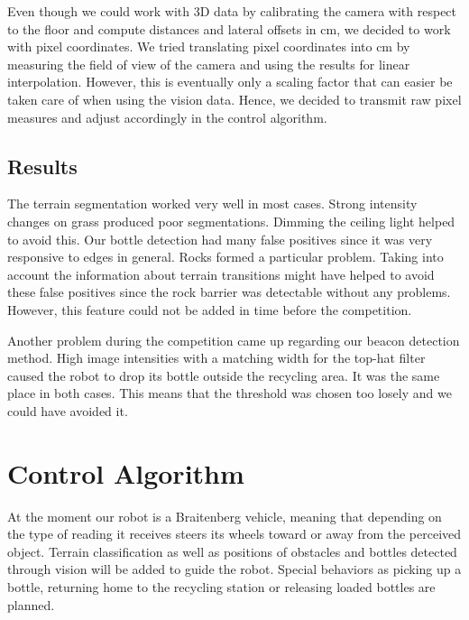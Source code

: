 Even though we could work with 3D data by calibrating the camera with respect to the
floor and compute distances and lateral offsets in cm, we decided to work with pixel
coordinates. We tried translating pixel coordinates into cm by measuring the field of view
of the camera and using the results for linear interpolation. However, this is eventually
only a scaling factor that can easier be taken care of when using the vision data. Hence,
we decided to transmit raw pixel measures and adjust accordingly in the control algorithm.

\subsection{Results}
The terrain segmentation worked very well in most cases. Strong intensity changes on grass
produced poor segmentations. Dimming the ceiling light helped to avoid this. 
Our bottle detection had many false positives since it was very responsive to edges in
general. Rocks formed a particular problem. Taking into account the information
about terrain transitions might have helped to avoid these false positives since the 
rock barrier was detectable without any problems. However, this feature could not 
be added in time before the competition. 

Another problem during the competition came up regarding our beacon detection method.
High image intensities with a matching width for the top-hat filter caused the robot
to drop its bottle outside the recycling area. It was the same place in both cases.
This means that the threshold was chosen too losely and we could have avoided it.

\section{Control Algorithm}
At the moment our robot is a Braitenberg vehicle, meaning that depending on the type
of reading it receives steers its wheels toward or away from the perceived object. 
Terrain classification as well as positions of obstacles and bottles detected through 
vision will be added to guide the robot. Special behaviors as picking up a bottle, 
returning home to the recycling station or releasing loaded bottles are planned.
